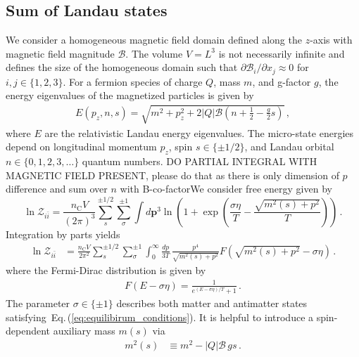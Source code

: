 \documentclass[epjST]{svjour}
\newcommand{\req}[1]{Eq.\,(\ref{#1})}
\begin{document}
\subsection{Sum of Landau states}
\label{sec:Landau}
We consider a homogeneous magnetic field domain defined along the $z$-axis with magnetic field magnitude $\mathcal{B}$. The volume $V=L^{3}$ is not necessarily infinite and defines the size of the homogeneous domain such that $\partial\mathcal{B}_{i}/\partial x_{j}\approx0$ for \(i,j \in \{1,2,3\}\). For a fermion species of charge $Q$, mass $m$, and g-factor $g$, the energy eigenvalues of the magnetized particles is given by~\cite{Steinmetz:2018ryf}
\begin{align}
\label{eq:energystates}
E(p_{z},n,s)=\sqrt{m^{2}+p_{z}^{2}+2|Q|\mathcal{B}\left(n+\frac{1}{2}-\frac{g}{2}s\right)}\,,
\end{align}
where $E$ are the relativistic Landau energy eigenvalues. The micro-state energies depend on longitudinal momentum \(p_{z}\), spin $s\in\{\pm1/2\}$, and Landau orbital $n\in\{0,1,2,3,\ldots\}$ quantum numbers. {\color{red}DO PARTIAL INTEGRAL WITH MAGNETIC FIELD PRESENT, please do that as there is only dimension of $p$ difference and sum over $n$ with B-co-factor}{\color{blue}We consider free energy given by 
\begin{equation}
 \ln\mathcal{Z}_{i\bar{i}} = \frac{n_\mathrm{C}V}{(2\pi)^{3}}\sum_{s}^{\pm1/2}\sum_{\sigma}^{\pm1}\int d\mathbf{p}^{3}\ln\left(1+\exp{\left(\frac{\sigma\eta}{T}-\frac{\sqrt{m^2(s)+p^{2}}}{T}\right)}\right)\,.
\end{equation}
Integration by parts yields
\begin{align}
\label{eq:partition_byparts}
\ln\mathcal{Z}_{i\bar{i}} &= \frac{n_\mathrm{C}V}{2\pi^{2}} \sum_{s}^{\pm1/2}\sum_{\sigma}^{\pm1}\int_{0}^{\infty} \frac{dp}{3T} \, \frac{p^4}{\sqrt{m^2(s)+p^{2}}}F\left(\sqrt{m^2(s)+p^{2}} - \sigma\eta\right)\,.
\end{align}
where} the Fermi-Dirac distribution is given by
\begin{align}
\label{eq:FermiDirac}
F\left(E - \sigma\eta\right) = \frac{1}{e^{(E - \sigma\eta)/T} + 1}\,.
\end{align}
The parameter \(\sigma \in\{\pm1\}\) describes both matter and antimatter states satisfying~\req{eq:equilibirum_conditions}. It is helpful to introduce a spin-dependent auxiliary mass $m(s)$ via
\begin{align}
\label{eq:spinmass}
m^{2}(s) &\equiv m^{2} - |Q|\mathcal{B}\,g s\,.
\end{align}
\end{document}

